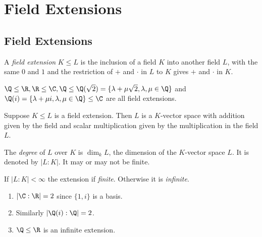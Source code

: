\documentclass[a4paper]{article}
\begin{document}
\section{Field Extensions}

\subsection{Field Extensions}

\begin{definition}
  A \emph{field extension} \(K \leq L\) is the inclusion of a field \(K\) into another field \(L\), with the same \(0\) and \(1\) and the restriction of \(+\) and \(\cdot\) in \(L\) to \(K\) gives \(+\) and \(\cdot\) in \(K\).
\end{definition}

\begin{eg}
  \(\Q \leq \R, \R \leq \C, \Q \leq \Q(\sqrt 2) = \{\lambda + \mu \sqrt 2, \lambda, \mu \in \Q\}\) and \(\Q(i) = \{\lambda + \mu i, \lambda, \mu \in \Q\} \leq \C\) are all field extensions.
\end{eg}

Suppose \(K \leq L\) is a field extension. Then \(L\) is a \(K\)-vector space with addition given by the field and scalar multiplication given by the multiplication in the field \(L\).

\begin{definition}
  The \emph{degree} of \(L\) over \(K\) is \(\dim_kL\), the dimension of the \(K\)-vector space \(L\). It is denoted by \(|L:K|\). It may or may not be finite.
\end{definition}

\begin{definition}
  If \(|L:K| < \infty\) the extension if \emph{finite}. Otherwise it is \emph{infinite}.
\end{definition}

\begin{eg}\leavevmode
  \begin{enumerate}
  \item \(|\C:\R| = 2\) since \(\{1, i\}\) is a basis.
  \item Similarly \(|\Q(i):\Q| = 2\).
  \item \(\Q \leq \R\) is an infinite extension.
  \end{enumerate}
\end{eg}
\end{document}
